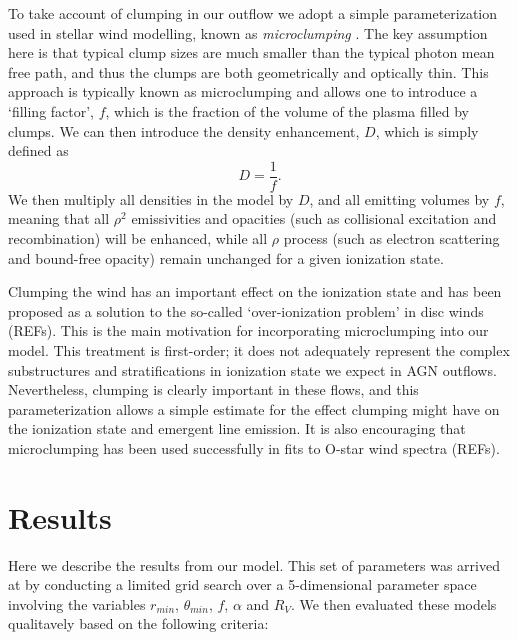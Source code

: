 \documentclass[preprint, a4paper, 11pt]{aastex}
\begin{document}
To take account of clumping in our outflow we adopt a simple parameterization
used in stellar wind modelling, known as {\em microclumping} \citep{hamann1998}. 
The key assumption here is that typical clump sizes
are much smaller than the typical photon mean free path, and thus the clumps are 
both geometrically and optically thin. This approach is typically 
known as microclumping and allows one to introduce a `filling factor', $f$, which is the 
fraction of the volume of the plasma filled by clumps. We can then introduce the 
density enhancement, $D$, which is simply defined as 
\begin{equation}
D = \frac{1}{f}.
\end{equation}
We then multiply all densities in the model by $D$, and all emitting volumes
by $f$, meaning that all $\rho^2$ emissivities and opacities
(such as collisional excitation and recombination) will be enhanced, 
while all $\rho$ process (such as electron scattering and bound-free opacity)
remain unchanged for a given ionization state. 

Clumping the wind has an important effect on the ionization state and has
been proposed as a solution to the so-called `over-ionization problem' in 
disc winds (REFs). This is the main motivation for incorporating microclumping
into our model. This treatment is first-order; it does not adequately
represent the complex substructures and stratifications in ionization
state we expect in AGN outflows. Nevertheless, clumping is clearly
important in these flows, and this parameterization allows a simple estimate
for the effect clumping might have on the ionization state and emergent 
line emission. It is also encouraging that microclumping has been used 
successfully in fits to O-star wind spectra (REFs).







\section{Results}

Here we describe the results from our model. This set of parameters
was arrived at by conducting a limited grid search over a 
5-dimensional parameter space involving the variables
$r_{min}$, $\theta_{min}$, $f$, $\alpha$ and $R_V$.
We then evaluated these models qualitavely based on the following
criteria:
\end{document}
